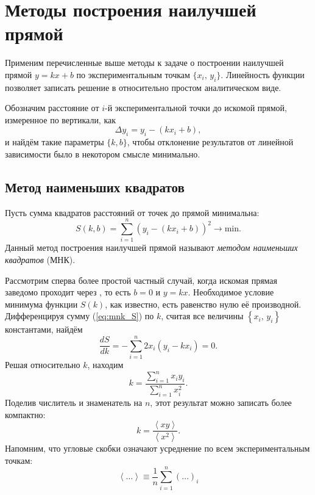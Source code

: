 
\section{Методы построения наилучшей прямой}
Применим перечисленные выше методы к задаче о построении наилучшей прямой
$y=kx+b$ по экспериментальным точкам $\{x_i,\,y_i\}$.
Линейность функции позволяет записать решение в относительно
простом аналитическом виде.

Обозначим расстояние от $i$-й экспериментальной точки до искомой прямой,
измеренное по вертикали, как
\[
\Delta y_{i}=y_{i}-\left(kx_{i}+b\right),
\]
и найдём такие параметры $\{k,b\}$, чтобы  отклонение
результатов от линейной зависимости было в некотором смысле минимально.

\subsection{Метод наименьших квадратов}\label{sec:MNK}
\label{sec:linear}
Пусть сумма квадратов расстояний от точек до прямой минимальна:
\begin{equation}\label{eq:mnk_S}
S\!\left(k,b\right)=
\sum\limits _{i=1}^{n}(y_i-(kx_i+b))^{2}\to\mathrm{min}.
\end{equation}
Данный метод построения наилучшей прямой называют \emph{методом наименьших
квадратов} (МНК).

Рассмотрим сперва более простой частный случай, когда искомая прямая
заведомо проходит через , то есть $b=0$ и $y=kx$.
Необходимое условие минимума функции $S\left(k\right)$, как известно,
есть равенство нулю её производной. Дифференцируя сумму (\ref{eq:mnk_S})
по $k$, считая все величины $\left\{ x_{i},\,y_{i}\right\} $ константами,
найдём
\[
\frac{dS}{dk}=-\sum\limits _{i=1}^{n}2x_{i}\left(y_{i}-kx_{i}\right)=0.
\]
Решая относительно $k$, находим
\[
k=\frac{\sum\limits _{i=1}^{n}x_{i}y_{i}}{\sum\limits _{i=1}^{n}x_{i}^{2}}.
\]
Поделив числитель и знаменатель на $n$, этот результат можно записать
более компактно:
\begin{equation}
k=\frac{\left\langle xy\right\rangle }{\left\langle x^{2}\right\rangle}.
\label{eq:MNK0}
\end{equation}
Напомним, что угловые скобки означают усреднение по всем экспериментальным точкам:
\[
\left\langle \ldots\right\rangle \equiv\frac{1}{n}\sum\limits
_{i=1}^{n}\left(\ldots\right)_{i}
\]

